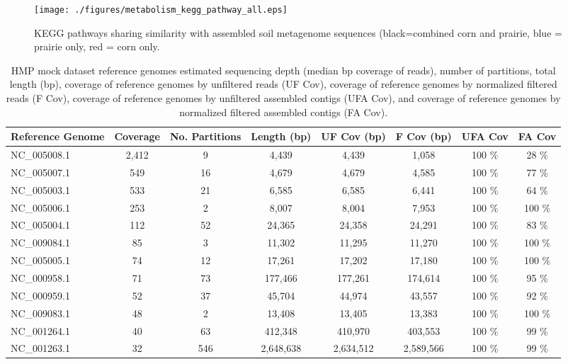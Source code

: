 \documentclass{pnastwo}
\begin{document}
\begin{figure}
\begin{center}
\centerline{\texttt{[image: ./figures/metabolism\_kegg\_pathway\_all.eps]}}
\caption{KEGG pathways sharing similarity with assembled soil metagenome sequences (black=combined corn and prairie, blue = prairie only, red = corn only.}
\label{kegg}
\end{center}
\end{figure}



\begin{table}
\caption{HMP mock dataset reference genomes estimated sequencing depth
  (median bp coverage of reads), number of partitions, total length
  (bp), coverage of reference genomes by unfiltered reads (UF Cov),
  coverage of reference genomes by normalized filtered reads (F Cov), coverage of
  reference genomes by unfiltered assembled contigs (UFA Cov), and
  coverage of reference genomes by normalized filtered assembled contigs (FA
  Cov).}
\begin{tabular}{@{\extracolsep{\fill}}l c c c c c c c}
\hline Reference Genome & Coverage & No. Partitions & Length (bp) & UF
Cov (bp) & F Cov (bp) & UFA Cov & FA Cov \\ \hline
NC\_005008.1 &
2,412 & 9 & 4,439 & 4,439 & 1,058 & 100 \% & 28 \% \\
NC\_005007.1 &
549 & 16 & 4,679 & 4,679 & 4,585 & 100 \% & 77 \% \\
NC\_005003.1 &
533 & 21 & 6,585 & 6,585 & 6,441 & 100 \% & 64 \% \\
NC\_005006.1 &
253 & 2 & 8,007 & 8,004 & 7,953 & 100 \% & 100 \% \\
NC\_005004.1 &
112 & 52 & 24,365 & 24,358 & 24,291 & 100 \% & 83 \% \\
NC\_009084.1 &
85 & 3 & 11,302 & 11,295 & 11,270 & 100 \% & 100 \% \\
NC\_005005.1 & 74
& 12 & 17,261 & 17,202 & 17,180 & 100 \% & 100 \% \\
NC\_000958.1 & 71
& 73 & 177,466 & 177,261 & 174,614 & 100 \% & 95 \% \\
NC\_000959.1 & 52
& 37 & 45,704 & 44,974 & 43,557 & 100 \% & 92 \% \\
NC\_009083.1 &
48 & 2 & 13,408 & 13,405 & 13,383 & 100 \% & 100 \% \\
NC\_001264.1 & 40
& 63 & 412,348 & 410,970 & 403,553 & 100 \% & 99 \% \\
NC\_001263.1 & 32
& 546 & 2,648,638 & 2,634,512 & 2,589,566 & 100 \% & 99 \% \\

\end{tabular}
\end{table}
\end{document}
